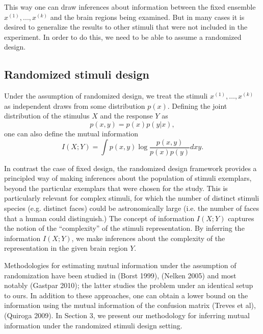 \documentclass[12pt]{article}
\begin{document}
This way one can draw inferences about information between the fixed
ensemble $x^{(1)},...,x^{(k)}$ and the brain regions being examined.  But in
many cases it is desired to generalize the results to other stimuli
that were not included in the experiment.  In order to do this, we
need to be able to assume a randomized design.

\subsection{Randomized stimuli design}

Under the assumption of randomized design, we treat the stimuli
$x^{(1)},\hdots, x^{(k)}$ as independent draws from some distribution $p(x)$.
Defining the joint distribution of the stimulus $X$ and the response
$Y$ as
\[
p(x, y) = p(x) p(y|x),
\]
one can also define the mutual information
\[
I(X; Y) = \int p(x, y) \log \frac{p(x, y)}{p(x) p(y)} dxy.
\]

In contrast the case of fixed design, the randomized design framework
provides a principled way of making inferences about the population of
stimuli exemplars, beyond the particular exemplars that were chosen
for the study.  This is particularly relevant for complex stimuli, for
which the number of distinct stimuli species (e.g. distinct faces)
could be astronomically large (i.e. the number of faces that a human
could distinguish.)  The concept of information $I(X; Y)$ captures the
notion of the ``complexity'' of the stimuli representation.  By
inferring the information $I(X; Y)$, we make inferences about the
complexity of the representation in the given brain region $Y$.

Methodologies for estimating mutual information under the assumption
of randomization have been studied in (Borst 1999), (Nelken 2005) and
most notably (Gastpar 2010); the latter studies the problem under an
identical setup to ours.  In addition to these approaches, one can
obtain a lower bound on the information using the mutual information
of the confusion matrix (Treves et al), (Quiroga 2009).  In Section 3,
we present our methodology for inferring mutual information under the
randomized stimuli design setting.
\end{document}
